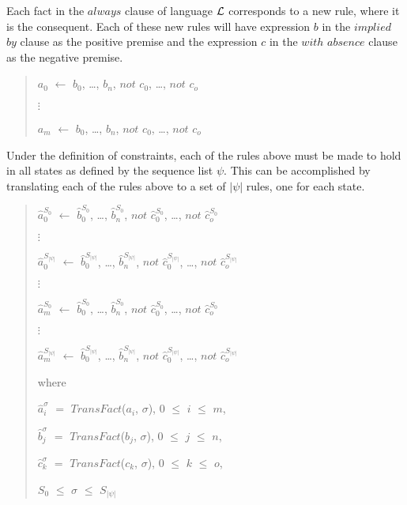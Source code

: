 \documentclass[10pt, twocolumn]{article}
\begin{document}
          Each fact in the $always$ clause of language ${\cal L}$ corresponds
          to a new rule, where it is the consequent. Each of these new rules
          will have expression $b$ in the $implied$ $by$ clause as the positive
          premise and the expression $c$ in the $with$ $absence$ clause as the
          negative premise.

          \begin{quote}
            $a_{0}$ $\leftarrow$
            $b_{0}$, \ldots, $b_{n}$,
            $not$ $c_{0}$, \ldots, $not$ $c_{o}$

            $\vdots$

            $a_{m}$ $\leftarrow$
            $b_{0}$, \ldots, $b_{n}$,
            $not$ $c_{0}$, \ldots, $not$ $c_{o}$
          \end{quote}

          Under the definition of constraints, each of the rules above must be
          made to hold in all states as defined by the sequence list $\psi$.
          This can be accomplished by translating each of the rules above to
          a set of $|\psi|$ rules, one for each state.

           \begin{quote}
            $\hat{a}^{S_{0}}_{0}$ $\leftarrow$
            $\hat{b}^{S_{0}}_{0}$, \ldots, $\hat{b}^{S_{0}}_{n}$,
            $not$ $\hat{c}^{S_{0}}_{0}$, \ldots, $not$ $\hat{c}^{S_{0}}_{o}$

            $\vdots$

            $\hat{a}^{S_{|\psi|}}_{0}$ $\leftarrow$
            $\hat{b}^{S_{|\psi|}}_{0}$, \ldots, $\hat{b}^{S_{|\psi|}}_{n}$,
            $not$ $\hat{c}^{S_{|\psi|}}_{0}$, \ldots, $not$ $\hat{c}^{S_{|\psi|}}_{o}$

            $\vdots$

            $\hat{a}^{S_{0}}_{m}$ $\leftarrow$
            $\hat{b}^{S_{0}}_{0}$, \ldots, $\hat{b}^{S_{0}}_{n}$,
            $not$ $\hat{c}^{S_{0}}_{0}$, \ldots, $not$ $\hat{c}^{S_{0}}_{o}$

            $\vdots$

            $\hat{a}^{S_{|\psi|}}_{m}$ $\leftarrow$
            $\hat{b}^{S_{|\psi|}}_{0}$, \ldots, $\hat{b}^{S_{|\psi|}}_{n}$,
            $not$ $\hat{c}^{S_{|\psi|}}_{0}$, \ldots, $not$ $\hat{c}^{S_{|\psi|}}_{o}$

            where

            $\hat{a}^{\sigma}_{i}$ $=$ $TransFact$($a_{i}$, $\sigma$),
            $0$ $\leq$ $i$ $\leq$ $m$,

            $\hat{b}^{\sigma}_{j}$ $=$ $TransFact$($b_{j}$, $\sigma$),
            $0$ $\leq$ $j$ $\leq$ $n$,

            $\hat{c}^{\sigma}_{k}$ $=$ $TransFact$($c_{k}$, $\sigma$),
            $0$ $\leq$ $k$ $\leq$ $o$,

            $S_{0}$ $\leq$ $\sigma$ $\leq$ $S_{|\psi|}$
          \end{quote}
\end{document}
